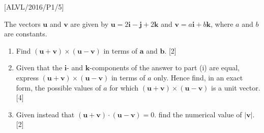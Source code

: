 \item {[}ALVL/2016/P1/5{]}

The vectors $\mathbf{u}$ and $\mathbf{v}$ are given by $\mathbf{u}=2\mathbf{i}-\mathbf{j}+2\mathbf{k}$
and $\mathbf{v}=a\mathbf{i}+b\mathbf{k}$, where $a$ and $b$ are
constants. 
\begin{enumerate}
\item Find $\left(\mathbf{u}+\mathbf{v}\right)\times\left(\mathbf{u}-\mathbf{v}\right)$
in terms of $\mathbf{a}$ and $\mathbf{b}$. \hfill{} {[}2{]}
\item Given that the $\mathbf{i}$- and $\mathbf{k}$-components of the
answer to part (i) are equal, express $\left(\mathbf{u}+\mathbf{v}\right)\times\left(\mathbf{u}-\mathbf{v}\right)$
in terms of $a$ only. Hence find, in an exact form, the possible
values of $a$ for which $\left(\mathbf{u}+\mathbf{v}\right)\times\left(\mathbf{u}-\mathbf{v}\right)$
is a unit vector. \hfill{}{[}4{]}
\item Given instead that $\left(\mathbf{u}+\mathbf{v}\right)\cdot\left(\mathbf{u}-\mathbf{v}\right)=0$.
find the numerical value of $\left|\mathbf{v}\right|$. \hfill{}{[}2{]}
\end{enumerate}
